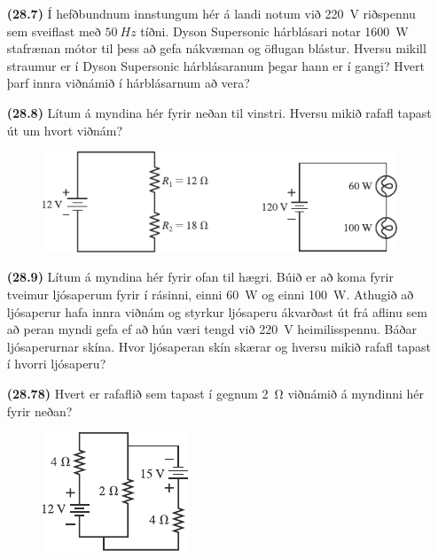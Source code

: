 \ifdefined \wholebook \else\documentclass[oneside]{book}\usepackage{EdlBook}\graphicspath{{figures/}}
\begin{document}
\begin{enumerate}[label = \textbf{(\alph*)}]

\item[\textbf{(28.7)}] Í hefðbundnum innstungum hér á landi notum við \SI{220}{V} riðspennu sem sveiflast með $\SI{50}{Hz}$ tíðni. Dyson Supersonic hárblásari notar \SI{1600}{W} stafrænan mótor til þess að gefa nákvæman og öflugan blástur. Hversu mikill straumur er í Dyson Supersonic hárblásaranum þegar hann er í gangi? Hvert þarf innra viðnámið í hárblásarnum að vera?

\item[\textbf{(28.8)}] Lítum á myndina hér fyrir neðan til vinstri. Hversu mikið rafafl tapast út um hvort viðnám?

\begin{figure}[H]
    \centering
    \includegraphics[scale = 1.25]{figures/rk288.pdf}
\end{figure}

\item[\textbf{(28.9)}] Lítum á myndina hér fyrir ofan til hægri. Búið er að koma fyrir tveimur ljósaperum fyrir í rásinni, einni \SI{60}{W} og einni \SI{100}{W}. Athugið að ljósaperur hafa innra viðnám og styrkur ljósaperu ákvarðast út frá aflinu sem að peran myndi gefa ef að hún væri tengd við \SI{220}{V} heimilisspennu. Báðar ljósaperurnar skína. Hvor ljósaperan skín skærar og hversu mikið rafafl tapast í hvorri ljósaperu?

\item[\textbf{(28.78)}] Hvert er rafaflið sem tapast í gegnum \SI{2}{\ohm} viðnámið á myndinni hér fyrir neðan?

\begin{figure}[H]
    \centering
    \includegraphics[scale = 1.25]{figures/rk2873.pdf}
\end{figure}

\end{enumerate}
\end{document}

